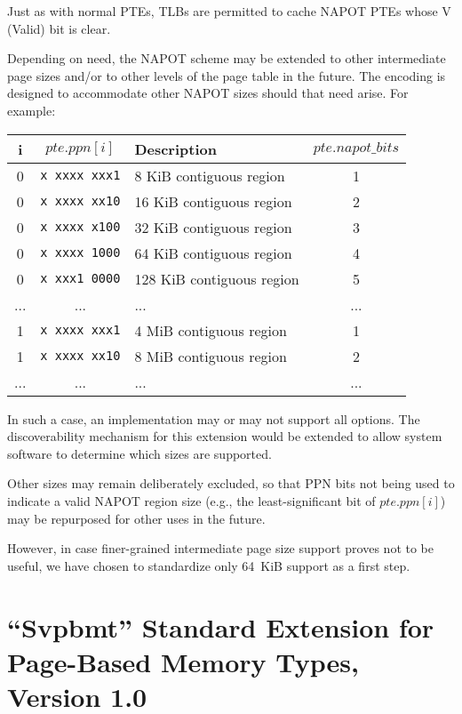 \begin{commentary}
  Just as with normal PTEs, TLBs are permitted to cache NAPOT PTEs whose V
  (Valid) bit is clear.

  Depending on need, the NAPOT scheme may be extended to other intermediate
  page sizes and/or to other levels of the page table in the future.  The
  encoding is designed to accommodate other NAPOT sizes should that need
  arise.  For example:

  \begin{center}\em
  \begin{tabular}{|c|c||l|c|}
  \hline
  i        & $pte.ppn[i]$      & Description                & $pte.napot\_bits$ \\
  \hline
  0        & {\tt x~xxxx~xxx1} & 8 KiB contiguous region    & 1 \\
  0        & {\tt x~xxxx~xx10} & 16 KiB contiguous region   & 2 \\
  0        & {\tt x~xxxx~x100} & 32 KiB contiguous region   & 3 \\
  0        & {\tt x~xxxx~1000} & 64 KiB contiguous region   & 4 \\
  0        & {\tt x~xxx1~0000} & 128 KiB contiguous region  & 5 \\
  ...      & ...               & ...                        & ... \\
  1        & {\tt x~xxxx~xxx1} & 4 MiB contiguous region    & 1 \\
  1        & {\tt x~xxxx~xx10} & 8 MiB contiguous region    & 2 \\
  ...      & ...               & ...                        & ... \\
  \hline
  \end{tabular}
  \end{center}

  In such a case, an implementation may or may not support all options.  The
  discoverability mechanism for this extension would be extended to allow
  system software to determine which sizes are supported.

  Other sizes may remain deliberately excluded, so that PPN bits not being
  used to indicate a valid NAPOT region size (e.g., the least-significant bit
  of $pte.ppn[i]$) may be repurposed for other uses in the future.

  However, in case finer-grained intermediate page size support proves not to
  be useful, we have chosen to standardize only 64~KiB support as a first step.
\end{commentary}

\chapter{``Svpbmt'' Standard Extension for Page-Based Memory Types, Version 1.0}
\label{svpbmt}

